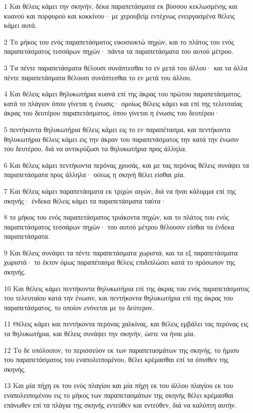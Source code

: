 \par 1 Και θέλεις κάμει την σκηνήν, δέκα παραπετάσματα εκ βύσσου κεκλωσμένης και κυανού και πορφυρού και κοκκίνου· με χερουβείμ εντέχνως ενειργασμένα θέλεις κάμει αυτά.
\par 2 Το μήκος του ενός παραπετάσματος εικοσιοκτώ πηχών, και το πλάτος του ενός παραπετάσματος τεσσάρων πηχών· πάντα τα παραπετάσματα του αυτού μέτρου.
\par 3 Τα πέντε παραπετάσματα θέλουσι συνάπτεσθαι το εν μετά του άλλου· και τα άλλα πέντε παραπετάσματα θέλουσι συνάπτεσθαι το εν μετά του άλλου.
\par 4 Και θέλεις κάμει θηλυκωτήρια κυανά επί της άκρας του πρώτου παραπετάσματος, κατά το πλάγιον όπου γίνεται η ένωσις· ομοίως θέλεις κάμει και επί της τελευταίας άκρας του δευτέρου παραπετάσματος, όπου γίνεται η ένωσις του δευτέρου·
\par 5 πεντήκοντα θηλυκωτήρια θέλεις κάμει εις το εν παραπέτασμα, και πεντήκοντα θηλυκωτήρια θέλεις κάμει εις την άκραν του παραπετάσματος την κατά την ένωσιν του δευτέρου, διά να αντικρύζωσι τα θηλυκωτήρια προς άλληλα.
\par 6 Και θέλεις κάμει πεντήκοντα περόνας χρυσάς, και με τας περόνας θέλεις συνάψει τα παραπετάσματα προς άλληλα· ούτως η σκηνή θέλει είσθαι μία.
\par 7 Και θέλεις κάμει παραπετάσματα εκ τριχών αιγών, διά να ήναι κάλυμμα επί της σκηνής· ένδεκα θέλεις κάμει τα παραπετάσματα ταύτα·
\par 8 το μήκος του ενός παραπετάσματος τριάκοντα πηχών, και το πλάτος του ενός παραπετάσματος τεσσάρων πηχών· του αυτού μέτρου θέλουσιν είσθαι τα ένδεκα παραπετάσματα.
\par 9 Και θέλεις συνάψει τα πέντε παραπετάσματα χωριστά, και τα εξ παραπετάσματα χωριστά· το έκτον όμως παραπέτασμα θέλεις επιδιπλώσει κατά το πρόσωπον της σκηνής.
\par 10 Και θέλεις κάμει πεντήκοντα θηλυκωτήρια επί της άκρας του ενός παραπετάσματος του τελευταίου κατά την ένωσιν, και πεντήκοντα θηλυκωτήρια επί της άκρας του παραπετάσματος, το οποίον ενόνεται με το δεύτερον.
\par 11 Θέλεις κάμει και πεντήκοντα περόνας χαλκίνας, και θέλεις εμβάλει τας περόνας εις τα θηλυκωτήρια, και θέλεις συνάψει την σκηνήν, ώστε να ήναι μία.
\par 12 Το δε υπόλοιπον, το περισσεύον εκ των παραπετασμάτων της σκηνής, το ήμισυ του παραπετάσματος του εναπολειπομένου, θέλει κρέμασθαι επί τα όπισθεν της σκηνής.
\par 13 Και μία πήχη εκ του ενός πλαγίου και μία πήχη εκ του άλλου πλαγίου εκ του εναπολειπομένου εις το μήκος των παραπετασμάτων της σκηνής θέλει κρέμασθαι επάνωθεν επί τα πλάγια της σκηνής εντεύθεν και εντεύθεν, διά να καλύπτη αυτήν.
